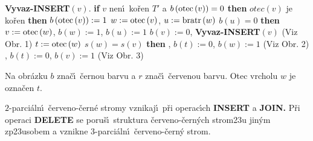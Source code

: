 {\bf Vyvaz-INSERT$\left(v\right)$}.\newline 
{\bf if} $v$ nen\'\i\ ko\v ren $T'$ a $b\left(\operatorname{otec}\left(v\right)\right)=0$ {\bf then}\newline 
\phantom{---}{\bf if} $otec\left(v\right)$ je ko\v ren {\bf then}\newline 
\phantom{------}$b\left(\operatorname{otec}\left(v\right)\right):=1$\newline 
\phantom{---}{\bf else}\newline 
\phantom{------}$w:=\operatorname{otec}\left(v\right)$, $u:=\operatorname{bratr}\left(w\right)$\newline 
\phantom{------}{\bf if} $b\left(u\right)=0$ {\bf then}\newline 
\phantom{---------}$v:=\operatorname{otec}\left(w\right)$, $b\left(w\right):=1$, $b\left(u\right):=1$\newline 
\phantom{---------}$b\left(v\right):=0$, {\bf Vyvaz-INSERT$\left(v\right)$} (Viz Obr. 1)\newline 
\phantom{------}{\bf else}\newline 
\phantom{---------}$t:=\operatorname{otec}\left(w\right)$\newline 
\phantom{---------}{\bf if} $s\left(w\right)=s\left(v\right)$ {\bf then}\newline 
\phantom{------------}{\bf Rotace$\left(t,w\right)$}, $b\left(t\right):=0$, $b\left(w\right):=1$ (Viz Obr. 2)\newline 
\phantom{---------}{\bf else}\newline 
\phantom{------------}{\bf Dvojita-rotace$\left(t,w,v\right)$}, $b\left(t\right):=0$, $b\left(v\right):=1$ (Viz Obr. 3)\newline 
\phantom{---------}{\bf endif}\newline 
\phantom{------}{\bf endif}\newline 
\phantom{---}{\bf endif\newline 
endif}
\medskip

\flushpar Na obr\'azku $b$ zna\v c\'\i\ \v cernou barvu a $r$ zna\v c\'\i\ \v cervenou 
barvu. Otec vrcholu $w$ je ozna\v cen $t$. 
\medskip

\midinsert
\centerline{}
\endcaption
\endinsert

\midinsert
\centerline{}
\endcaption
\endinsert
\newpage

\midinsert
\centerline{}
\endcaption
\endinsert

\flushpar$2$-parci\'aln\'\i\ \v cerveno-\v cern\'e stromy vznikaj\'\i\ p\v ri 
operac\'\i ch {\bf INSERT} a {\bf JOIN.}  P\v ri operaci {\bf DELETE} se poru\v s\'\i\ 
struktura \v cerveno-\v cern\'ych strom\accent23u jin\'ym 
zp\accent23usobem a vznikne 3-parci\'aln\'\i\ \v cerveno-\v cer\-n\'y strom.  
\medskip

